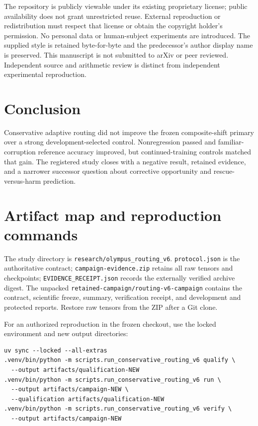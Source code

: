 The repository is publicly viewable under its existing proprietary license;
public availability does not grant unrestricted reuse. External reproduction
or redistribution must respect that license or obtain the copyright holder's
permission. No personal data or human-subject experiments are introduced.
The supplied style is retained byte-for-byte and the predecessor's author
display name is preserved. This manuscript is not submitted to arXiv or peer
reviewed. Independent source and arithmetic review is distinct from independent
experimental reproduction.

\section{Conclusion}
Conservative adaptive routing did not improve the frozen composite-shift
primary over a strong development-selected control. Nonregression passed and
familiar-corruption reference accuracy improved, but continued-training
controls matched that gain. The registered study closes with a negative
result, retained evidence, and a narrower successor question about corrective
opportunity and rescue-versus-harm prediction.

\appendix
\section{Artifact map and reproduction commands}
The study directory is \texttt{research/olympus\_routing\_v6}.
\texttt{protocol.json} is the authoritative contract;
\texttt{campaign-evidence.zip} retains all raw tensors and checkpoints;
\texttt{EVIDENCE\_RECEIPT.json} records the externally verified archive digest.
The unpacked \texttt{retained-campaign/routing-v6-campaign} contains the
contract, scientific freeze, summary, verification receipt, and development
and protected reports. Restore raw tensors from the ZIP after a Git clone.

\noindent\begin{minipage}{\linewidth}
For an authorized reproduction in the frozen checkout, use the locked environment
and new output directories:

\begin{verbatim}
uv sync --locked --all-extras
.venv/bin/python -m scripts.run_conservative_routing_v6 qualify \
  --output artifacts/qualification-NEW
.venv/bin/python -m scripts.run_conservative_routing_v6 run \
  --output artifacts/campaign-NEW \
  --qualification artifacts/qualification-NEW
.venv/bin/python -m scripts.run_conservative_routing_v6 verify \
  --output artifacts/campaign-NEW
\end{verbatim}
\end{minipage}

